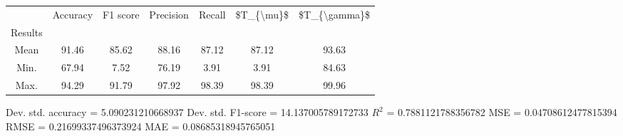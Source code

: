 \begin{tabular}{|c|c|c|c|c|c|c|}
\toprule
{} &  Accuracy &  F1 score &  Precision &  Recall &  \$T\_\{\textbackslash mu\}\$ &  \$T\_\{\textbackslash gamma\}\$ \\
Results &           &           &            &         &            &               \\
\hline
Mean    &     91.46 &     85.62 &      88.16 &   87.12 &      87.12 &         93.63 \\
Min.    &     67.94 &      7.52 &      76.19 &    3.91 &       3.91 &         84.63 \\
Max.    &     94.29 &     91.79 &      97.92 &   98.39 &      98.39 &         99.96 \\
\bottomrule
\end{tabular}

 Dev. std. accuracy = 5.090231210668937
 Dev. std. F1-score = 14.137005789172733
 $R^2$ = 0.7881121788356782
 MSE = 0.04708612477815394
 RMSE = 0.21699337496373924
 MAE = 0.08685318945765051